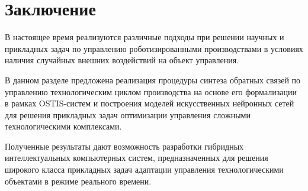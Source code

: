 




\section*{Заключение}

В настоящее время реализуются различные подходы при решении научных и прикладных задач по управлению роботизированными производствами в условиях наличия случайных внешних воздействий на объект управления.

В данном разделе предложена реализация процедуры синтеза обратных связей по управлению технологическим циклом производства на основе его формализации в рамках OSTIS-систем и построения моделей искусственных нейронных сетей для решения прикладных задач оптимизации управления сложными технологическими комплексами.

Полученные результаты дают возможность разработки гибридных интеллектуальных компьютерных систем, предназначенных для решения широкого класса прикладных задач адаптации управления технологическими объектами в режиме реального времени.






%
